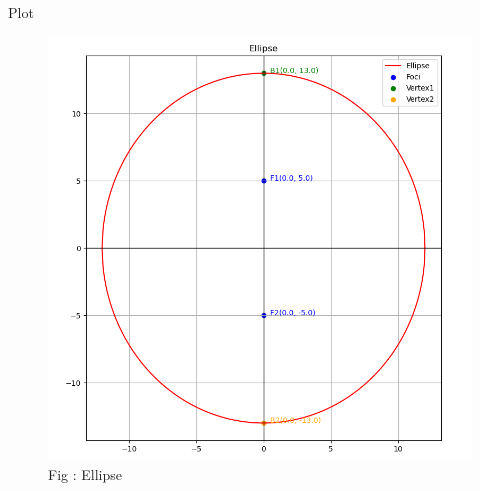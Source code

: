 \documentclass{beamer}
\numberwithin{equation}{section}
\theoremstyle{remark}
\begin{document}
\begin{frame}{Plot}

\begin{figure}[h!]
  \centering
  \includegraphics[width=0.6\columnwidth]{figs/ellipse.png} 
   \caption*{Fig : Ellipse}
  \label{Fig1}
\end{figure}

\end{frame}
\end{document}
